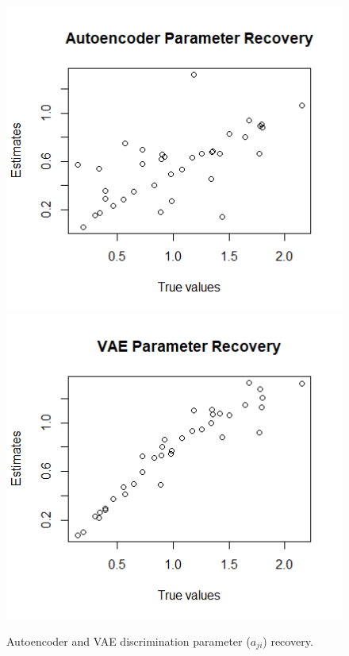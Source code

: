 \begin{figure}[h!]
   \includegraphics[width=\textwidth]{img/aied_results/ae_a_corr.png}
   \endminipage\hfill
   \includegraphics[width=\textwidth]{img/aied_results/vae_a_corr.png}
   \endminipage\hfill
   \caption{Autoencoder and VAE discrimination parameter ($a_{ji}$) recovery.}
   \label{fig:vae_vs_ae_a}
\end{figure}


